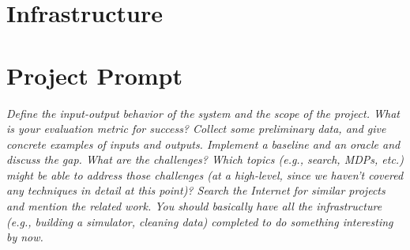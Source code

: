 \documentclass{article}
\begin{document}
\section*{Infrastructure} %

\section*{Project Prompt}

\textit{Define the input-output behavior of the system and the scope of the project. What is your evaluation metric for success? Collect some preliminary data, and give concrete examples of inputs and outputs. Implement a baseline and an oracle and discuss the gap. What are the challenges? Which topics (e.g., search, MDPs, etc.) might be able to address those challenges (at a high-level, since we haven't covered any techniques in detail at this point)? Search the Internet for similar projects and mention the related work. You should basically have all the infrastructure (e.g., building a simulator, cleaning data) completed to do something interesting by now.}
\end{document}
